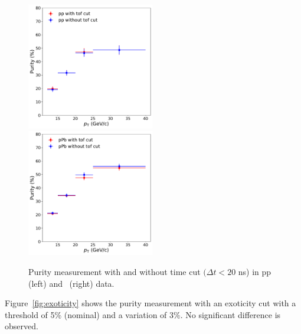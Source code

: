 \begin{figure}
	\center
	\includegraphics[width=0.495\textwidth]{Checks_Systematics/pptof.pdf}
	\includegraphics[width=0.495\textwidth]{Checks_Systematics/ppbtof.pdf}
	\caption{Purity measurement with and without time cut $(\Delta t<20$ ns) in pp (left) and \pPb~(right) data.}
	\label{fig:TOF_purity}
\end{figure}

Figure~\ref{fig:exoticity} shows the purity measurement with an exoticity cut with a threshold of 5\% (nominal) and a variation of $3\%$. No significant difference is observed. 

